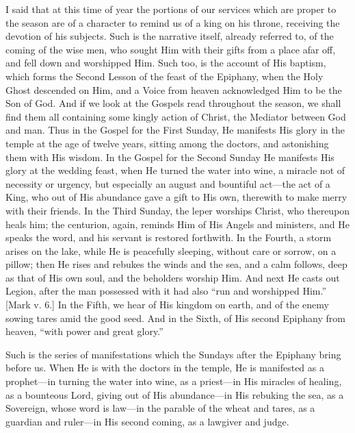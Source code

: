 I said that at this time of year the portions of our services which
are proper to the season are of a character to remind us of a king on
his throne, receiving the devotion of his subjects. Such is the
narrative itself, already referred to, of the coming of the wise men,
who sought Him with their gifts from a place afar off, and fell down
and worshipped Him. Such too, is the account of His baptism, which
forms the Second Lesson of the feast of the Epiphany, when the Holy
Ghost descended on Him, and a Voice from heaven acknowledged Him to be
the Son of God. And if we look at the Gospels read throughout the
season, we shall find them all containing some kingly action of
Christ, the Mediator between God and man. Thus in the Gospel for the
First Sunday, He manifests His glory in the temple at the age of
twelve years, sitting among the doctors, and astonishing them with His
wisdom. In the Gospel for the Second Sunday He manifests His glory at
the wedding feast, when He turned the water into wine, a miracle not
of necessity or urgency, but especially an august and bountiful act—the
act of a King, who out of His abundance gave a gift to His own,
therewith to make merry with their friends. In the Third Sunday, the
leper worships Christ, who thereupon heals him; the centurion, again,
reminds Him of His Angels and ministers, and He speaks the word, and
his servant is restored forthwith. In the Fourth, a storm arises on
the lake, while He is peacefully sleeping, without care or sorrow, on
a pillow; then He rises and rebukes the winds and the sea, and a calm
follows, deep as that of His own soul, and the beholders worship Him.
And next He casts out Legion, after the man possessed with it had also
``run and worshipped Him.'' [Mark v. 6.] In the Fifth, we hear
of His kingdom on earth, and of the enemy sowing tares amid the good
seed. And in the Sixth, of His second Epiphany from heaven, ``with
power and great glory.''

Such is the series of manifestations which the Sundays after the
Epiphany bring before us. When He is with the doctors in the temple,
He is manifested as a prophet—in turning the water into wine, as a
priest—in His miracles of healing, as a bounteous Lord, giving out
of His abundance—in His rebuking the sea, as a Sovereign, whose word
is law—in the parable of the wheat and tares, as a guardian and
ruler—in His second coming, as a lawgiver and judge.

